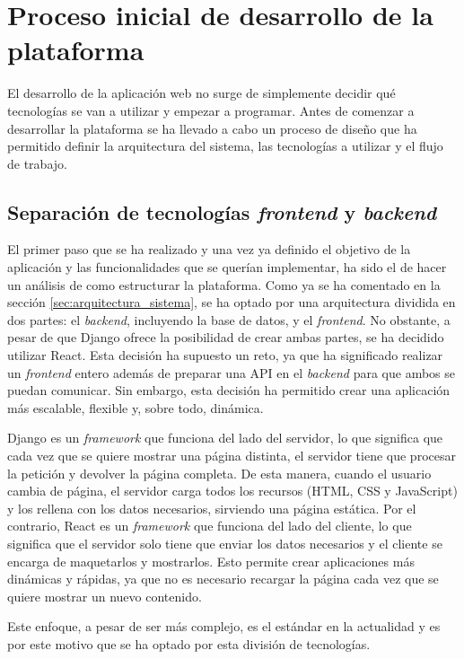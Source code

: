 \section{Proceso inicial de desarrollo de la plataforma}
\label{sec:proceso_desarrollo}

El desarrollo de la aplicación web no surge de simplemente decidir qué tecnologías se van a utilizar y empezar a programar. Antes de comenzar a desarrollar la plataforma se ha llevado a cabo un proceso de diseño que ha permitido definir la arquitectura del sistema, las tecnologías a utilizar y el flujo de trabajo.

\subsection{Separación de tecnologías \textit{frontend} y \textit{backend}}
\label{dev:subsec:separacion_frontend_backend}

El primer paso que se ha realizado y una vez ya definido el objetivo de la aplicación y las funcionalidades que se querían implementar, ha sido el de hacer un análisis de como estructurar la plataforma. Como ya se ha comentado en la sección \ref{sec:arquitectura_sistema}, se ha optado por una arquitectura dividida en dos partes: el \textit{backend}, incluyendo la base de datos, y el \textit{frontend}. No obstante, a pesar de que Django ofrece la posibilidad de crear ambas partes, se ha decidido utilizar React. Esta decisión ha supuesto un reto, ya que ha significado realizar un \textit{frontend} entero además de preparar una API en el \textit{backend} para que ambos se puedan comunicar. Sin embargo, esta decisión ha permitido crear una aplicación más escalable, flexible y, sobre todo, dinámica.

Django es un \textit{framework} que funciona del lado del servidor, lo que significa que cada vez que se quiere mostrar una página distinta, el servidor tiene que procesar la petición y devolver la página completa. De esta manera, cuando el usuario cambia de página, el servidor carga todos los recursos (HTML, CSS y JavaScript) y los rellena con los datos necesarios, sirviendo una página estática. Por el contrario, React es un \textit{framework} que funciona del lado del cliente, lo que significa que el servidor solo tiene que enviar los datos necesarios y el cliente se encarga de maquetarlos y mostrarlos. Esto permite crear aplicaciones más dinámicas y rápidas, ya que no es necesario recargar la página cada vez que se quiere mostrar un nuevo contenido.

Este enfoque, a pesar de ser más complejo, es el estándar en la actualidad y es por este motivo que se ha optado por esta división de tecnologías.